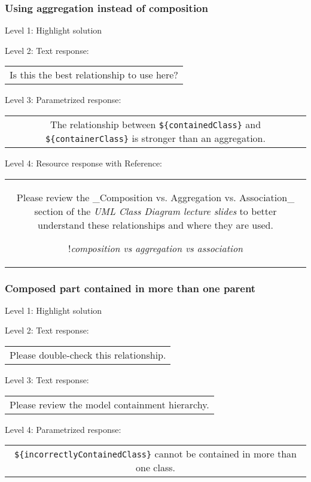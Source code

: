 \subsubsection{Using aggregation instead of composition}

\noindent Level 1: Highlight solution \medskip

\noindent Level 2: Text response: \medskip

\begin{tabular}{|c}
Is this the best relationship to use here?
\end{tabular} \medskip

\noindent Level 3: Parametrized response: \medskip

\begin{tabular}{|c}
The relationship between \verb|${containedClass}| and \verb|${containerClass}| is stronger than an aggregation.
\end{tabular} \medskip

\noindent Level 4: Resource response with Reference:

\begin{tabular}{|c}
Please review the _Composition vs. Aggregation vs. Association_ section of 
the \textit{UML Class Diagram lecture slides} to 
better understand these relationships and where they are used.

!\textit{composition vs aggregation vs association}
\end{tabular} \medskip


\subsubsection{Composed part contained in more than one parent}

\noindent Level 1: Highlight solution \medskip

\noindent Level 2: Text response: \medskip

\begin{tabular}{|c}
Please double-check this relationship.
\end{tabular} \medskip

\noindent Level 3: Text response: \medskip

\begin{tabular}{|c}
Please review the model containment hierarchy.
\end{tabular} \medskip

\noindent Level 4: Parametrized response: \medskip

\begin{tabular}{|c}
\verb|${incorrectlyContainedClass}| cannot be contained in more than one class.
\end{tabular} \medskip

